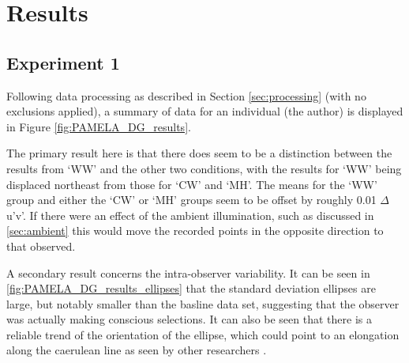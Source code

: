 \section{Results}

\subsection{Experiment 1}

Following data processing as described in Section \ref{sec:processing} (with no exclusions applied), a summary of data for an individual (the author) is displayed in Figure \ref{fig:PAMELA_DG_results}. 

The primary result here is that there does seem to be a distinction between the results from `WW' and the other two conditions, with the results for `WW' being displaced northeast from those for `CW' and `MH'. The means for the `WW' group and either the `CW' or `MH' groups seem to be offset by roughly 0.01 $\Delta$u'v'. If there were an effect of the ambient illumination, such as discussed in \ref{sec:ambient} this would move the recorded points in the opposite direction to that observed.

A secondary result concerns the intra-observer variability. It can be seen in \ref{fig:PAMELA_DG_results_ellipses} that the standard deviation ellipses are large, but notably smaller than the basline data set, suggesting that the observer was actually making conscious selections. It can also be seen that there is a reliable trend of the orientation of the ellipse, which could point to an elongation along the caerulean line as seen by other researchers \citep{bosten_what_2015}.


